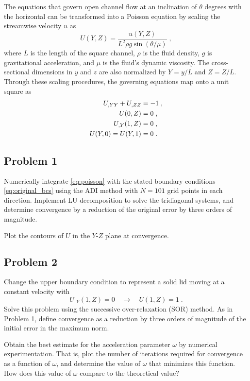 \documentclass[11pt]{article}
\begin{document}
The equations that govern open channel flow at an inclination of $\theta$ degrees with the horizontal can be transformed into a Poisson equation by scaling the streamwise velocity $u$ as
\begin{equation}
U(Y,Z) = \frac{u(Y,Z)}{L^2 \rho g \sin(\theta / \mu)}
\;,
\end{equation}
where $L$ is the length of the square channel, $\rho$ is the fluid density, $g$ is gravitational acceleration, and $\mu$ is the fluid's dynamic viscosity. The cross-sectional dimensions in $y$ and $z$ are also normalized by $Y = y/L$ and $Z = Z/L$. Through these scaling procedures, the governing equations map onto a unit square as
\begin{align}
U_{,YY} + U_{,ZZ} &= -1
\;, \label{eq:poisson} \\
U(0,Z) &= 0
\;, \notag\\
U_{,Y}(1,Z) &= 0
\;, \notag\\
U(Y,0) = U(Y,1) &= 0
\;.
\label{eq:original_bcs}
\end{align}

\subsection{Problem 1}

Numerically integrate \eqref{eq:poisson} with the stated boundary conditions \eqref{eq:original_bcs} using the ADI method with $N = 101$ grid points in each direction. Implement LU decomposition to solve the tridiagonal systems, and determine convergence by a reduction of the original error by three orders of magnitude.

Plot the contours of $U$ in the $Y$-$Z$ plane at convergence.

\subsection{Problem 2}

Change the upper boundary condition to represent a solid lid moving at a constant velocity with
\begin{equation}
U_{,Y}(1,Z) = 0 \quad\longrightarrow\quad U(1,Z) = 1
\;.
\end{equation}
Solve this problem using the successive over-relaxation (SOR) method. As in Problem 1, define convergence as a reduction by three orders of magnitude of the initial error in the maximum norm.

Obtain the best estimate for the acceleration parameter $\omega$ by numerical experimentation. That is, plot the number of iterations required for convergence as a function of $\omega$, and determine the value of $\omega$ that minimizes this function. How does this value of $\omega$ compare to the theoretical value?
\end{document}
